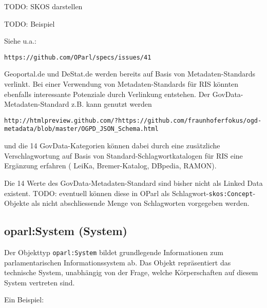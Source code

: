 \documentclass[,a4paper]{article}
\begin{document}
TODO: SKOS darstellen

TODO: Beispiel

Siehe u.a.:

\begin{verbatim}
https://github.com/OParl/specs/issues/41
\end{verbatim}

Geoportal.de und DeStat.de werden bereits auf Basis von
Metadaten-Standards verlinkt. Bei einer Verwendung von
Metadaten-Standards für RIS könnten ebenfalls interessante Potenziale
durch Verlinkung entstehen. Der GovData-Metadaten-Standard z.B. kann
genutzt werden

\begin{verbatim}
http://htmlpreview.github.com/?https://github.com/fraunhoferfokus/ogd-metadata/blob/master/OGPD_JSON_Schema.html
\end{verbatim}

und die 14 GovData-Kategorien können dabei durch eine zusätzliche
Verschlagwortung auf Basis von Standard-Schlagwortkatalogen für RIS eine
Ergänzung erfahren ( LeiKa, Bremer-Katalog, DBpedia, RAMON).

Die 14 Werte des GovData-Metadaten-Standard sind bisher nicht als Linked
Data existent. TODO: eventuell können diese in OParl als
Schlagwort-\texttt{skos:Concept}-Objekte als nicht abschliessende Menge
von Schlagworten vorgegeben werden.

\subsection{oparl:System (System)}\label{oparlux5fsystem}

Der Objekttyp \texttt{oparl:System} bildet grundlegende Informationen
zum parlamentarischen Informationssystem ab. Das Objekt repräsentiert
das technische System, unabhängig von der Frage, welche Körperschaften
auf diesem System vertreten sind.

Ein Beispiel:
\end{document}
